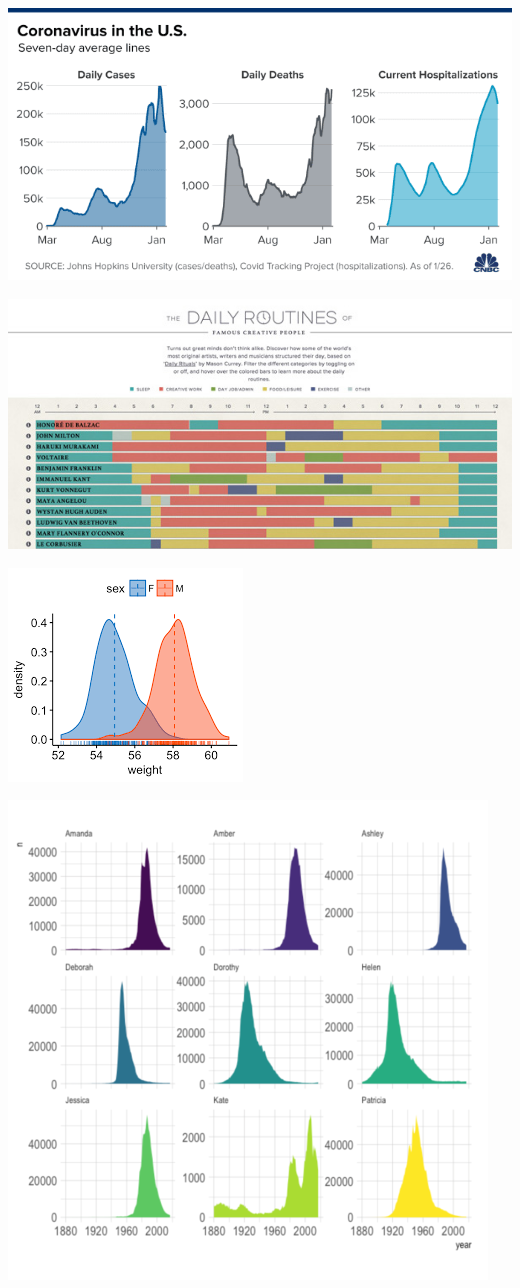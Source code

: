 \documentclass[
]{book}
\begin{document}
\includegraphics{img/vise.png}

\includegraphics{img/vise.jpg}

\includegraphics{img/visf.png}

\includegraphics{img/visg.png}
\end{document}
